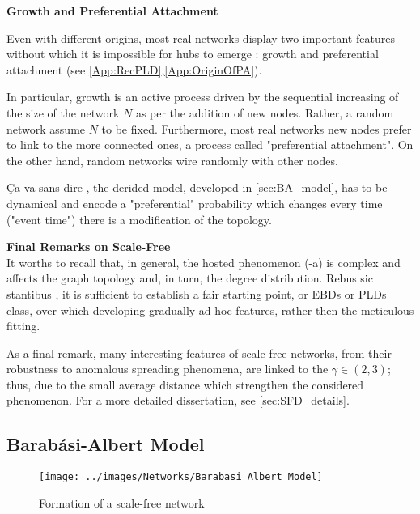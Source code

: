 \documentclass[a4paper,10pt,twoside]{book} %
\theoremstyle{definition}
\begin{document}
{\large \textbf{Growth and Preferential Attachment}} 

Even with different origins, most real networks display two important features without which it is impossible for hubs to emerge \cite{barabasi::2016networkbook}: growth and preferential attachment (see \autoref{App:RecPLD},\autoref{App:OriginOfPA}). 

In particular, growth is an active process driven by the sequential increasing of the size of the network $N$ as per the addition of new nodes. Rather, a random network assume $N$ to be fixed. \newline
Furthermore, most real networks new nodes prefer to link to the more connected ones, a process called "preferential attachment". On the other hand, random networks wire randomly with other nodes.

Ça va sans dire \label{cit:A.Marzo}, the derided model, developed in \autoref{sec:BA_model}, has to be dynamical and encode a "preferential" probability which changes every time ("event time") there is a modification of the topology. 

{\large \textbf{Final Remarks on Scale-Free}} \\
It worths to recall that, in general, the hosted phenomenon (-a) is complex and affects the graph topology and, in turn, the degree distribution. Rebus sic stantibus \label{cit:D.Massa}, it is sufficient to establish a fair starting point, or EBDs or PLDs class, over which developing gradually ad-hoc features, rather then the meticulous fitting.

As a final remark, many interesting features of scale-free networks, from their robustness to anomalous spreading phenomena, are linked to the $\gamma \in (2,3)$; thus, due to the small average distance which strengthen the considered phenomenon.
For a more detailed dissertation, see \autoref{sec:SFD_details}.

\newpage
\subsection{Barabási-Albert Model}
\begin{figure}[ht]
	\texttt{[image: ../images/Networks/Barabasi\_Albert\_Model]}
	\centering
	\caption{Formation of a scale-free network \cite{Barabasi:2009_SF_DecadeBeyond}}
	\label{fig:LCD_growth}
\end{figure}
\end{document}
